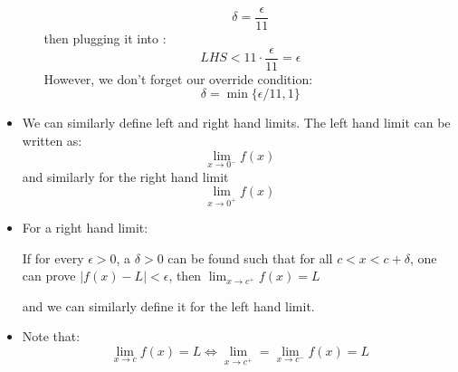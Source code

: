 \begin{itemize}
\begin{example}
\begin{enumerate}
            \begin{equation}
                \delta = \frac{\epsilon}{11}
                \label{eq:}
            \end{equation}
            then plugging it into :
            \begin{equation}
                LHS < 11\cdot \frac{\epsilon}{11}=\epsilon
                \label{eq:}
            \end{equation}
            However, we don't forget our override condition:
            \begin{equation}
                \delta = \min\{\epsilon/11,1\}
                \label{eq:}
            \end{equation}
        \end{enumerate}
    \end{example}
    \item We can similarly define left and right hand limits. The left hand limit can be written as:
    \begin{equation}
        \lim_{x\to 0^-} f(x)
        \label{eq:}
    \end{equation}
    and similarly for the right hand limit
    \begin{equation}
        \lim_{x\to 0^+}f(x)
        \label{eq:}
    \end{equation}
    \item For a right hand limit:
    \begin{definition}
        If for every $\epsilon >0$, a $\delta >0$ can be found such that for all $c<x<c+\delta$, one can prove $|f(x)-L|<\epsilon$, then $\displaystyle \lim_{x\to c^+} f(x)=L$
    \end{definition}
    and we can similarly define it for the left hand limit.
    \item Note that:
    \begin{equation}
        \lim_{x\to c} f(x) = L \iff \lim_{x\to c^+} = \lim_{x \to c^-} f(x) = L
        \label{eq:}
    \end{equation}
    

\end{itemize}
